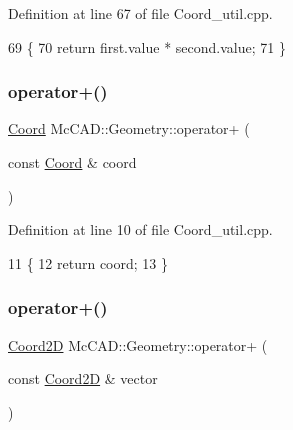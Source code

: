 Definition at line 67 of file Coord\+\_\+util.\+cpp.


\begin{DoxyCode}
69                             \{
70     \textcolor{keywordflow}{return} first.value * second.value;
71 \}
\end{DoxyCode}
\mbox{\label{namespaceMcCAD_1_1Geometry_a94290461e4f041c320957ca768de9012}} 
\subsubsection{\texorpdfstring{operator+()}{operator+()}\hspace{0.1cm}{\footnotesize\ttfamily [1/6]}}
{\footnotesize\ttfamily \hyperlink{classMcCAD_1_1Geometry_1_1Coord}{Coord} Mc\+C\+A\+D\+::\+Geometry\+::operator+ (\begin{DoxyParamCaption}\item[{const \hyperlink{classMcCAD_1_1Geometry_1_1Coord}{Coord} \&}]{coord }\end{DoxyParamCaption})}



Definition at line 10 of file Coord\+\_\+util.\+cpp.


\begin{DoxyCode}
11                            \{
12     \textcolor{keywordflow}{return} coord;
13 \}
\end{DoxyCode}
\mbox{\label{namespaceMcCAD_1_1Geometry_a1ce4043235fd21f1db10d3ef3bee7490}} 
\subsubsection{\texorpdfstring{operator+()}{operator+()}\hspace{0.1cm}{\footnotesize\ttfamily [2/6]}}
{\footnotesize\ttfamily \hyperlink{classMcCAD_1_1Geometry_1_1Coord2D}{Coord2D} Mc\+C\+A\+D\+::\+Geometry\+::operator+ (\begin{DoxyParamCaption}\item[{const \hyperlink{classMcCAD_1_1Geometry_1_1Coord2D}{Coord2D} \&}]{vector }\end{DoxyParamCaption})}



